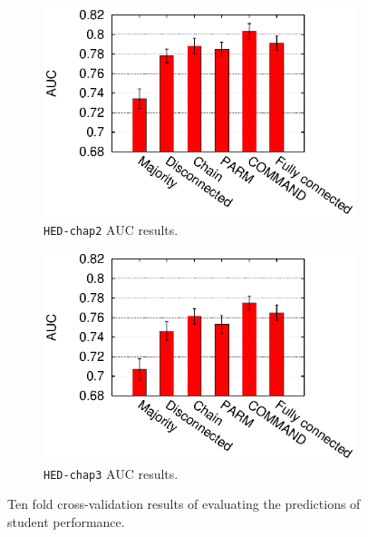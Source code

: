 \documentclass{edm_template}
\newcommand{\hl}[1]{\colorbox{yellow}{#1}}
\begin{document}
	\begin{figure}[!ht]
		\centering
		\begin{subfigure}[b]{0.48\linewidth}
			\centering
			\includegraphics[width=1.1\linewidth]{figures/hed_chap2_30_auc.eps}
			\caption{\texttt{HED-chap2} AUC results. }
			\label{fig:auc-chap2}
		\end{subfigure}
		\begin{subfigure}[b]{0.48\linewidth}
			\centering
			\includegraphics[width=1.1\linewidth]{figures/hed_chap3_33_auc.eps}
			\caption{\texttt{HED-chap3} AUC results.}
			\label{fig:auc-chap3}
		\end{subfigure}%
		\caption{Ten fold cross-validation results of evaluating the predictions of student performance. %
		\label{fig:aucs}
		}
	\end{figure} 	
	
\end{document}
